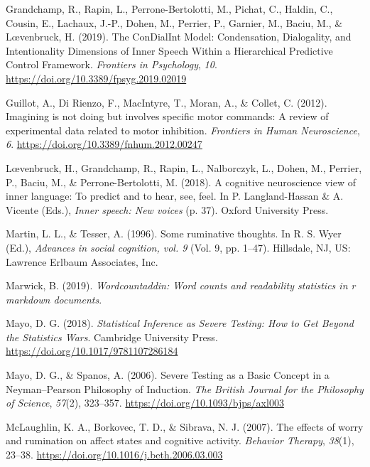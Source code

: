 \documentclass[
  english,
  man, donotrepeattitle,floatsintext]{apa6}
\newlength{\cslhangindent}
\newlength{\cslentryspacingunit} %
\newenvironment{CSLReferences}[2] %
 {%
  \setlength{\parindent}{0pt}
  \ifodd #1
  \let\oldpar\par
  \def\par{\hangindent=\cslhangindent\oldpar}
  \fi
  \setlength{\parskip}{#2\cslentryspacingunit}
 }%
 {}
\begin{document}
\begin{CSLReferences}{1}{0}
\leavevmode{}%
Grandchamp, R., Rapin, L., Perrone-Bertolotti, M., Pichat, C., Haldin, C., Cousin, E., Lachaux, J.-P., Dohen, M., Perrier, P., Garnier, M., Baciu, M., \& Lœvenbruck, H. (2019). The {ConDialInt Model}: Condensation, {Dialogality}, and {Intentionality Dimensions} of {Inner Speech Within} a {Hierarchical Predictive Control Framework}. \emph{Frontiers in Psychology}, \emph{10}. \url{https://doi.org/10.3389/fpsyg.2019.02019}

\leavevmode{}%
Guillot, A., Di Rienzo, F., MacIntyre, T., Moran, A., \& Collet, C. (2012). Imagining is not doing but involves specific motor commands: A review of experimental data related to motor inhibition. \emph{Frontiers in Human Neuroscience}, \emph{6}. \url{https://doi.org/10.3389/fnhum.2012.00247}

\leavevmode{}%
Lœvenbruck, H., Grandchamp, R., Rapin, L., Nalborczyk, L., Dohen, M., Perrier, P., Baciu, M., \& Perrone-Bertolotti, M. (2018). A cognitive neuroscience view of inner language: To predict and to hear, see, feel. In P. Langland-Hassan \& A. Vicente (Eds.), \emph{Inner speech: New voices} (p. 37). {Oxford University Press}.

\leavevmode{}%
Martin, L. L., \& Tesser, A. (1996). Some ruminative thoughts. In R. S. Wyer (Ed.), \emph{Advances in social cognition, vol. 9} (Vol. 9, pp. 1--47). {Hillsdale, NJ, US: Lawrence Erlbaum Associates, Inc}.

\leavevmode{}%
Marwick, B. (2019). \emph{Wordcountaddin: Word counts and readability statistics in r markdown documents}.

\leavevmode{}%
Mayo, D. G. (2018). \emph{Statistical {Inference} as {Severe Testing}: How to {Get Beyond} the {Statistics Wars}}. {Cambridge University Press}. \url{https://doi.org/10.1017/9781107286184}

\leavevmode{}%
Mayo, D. G., \& Spanos, A. (2006). Severe {Testing} as a {Basic Concept} in a {Neyman}--{Pearson Philosophy} of {Induction}. \emph{The British Journal for the Philosophy of Science}, \emph{57}(2), 323--357. \url{https://doi.org/10.1093/bjps/axl003}

\leavevmode{}%
McLaughlin, K. A., Borkovec, T. D., \& Sibrava, N. J. (2007). The effects of worry and rumination on affect states and cognitive activity. \emph{Behavior Therapy}, \emph{38}(1), 23--38. \url{https://doi.org/10.1016/j.beth.2006.03.003}


\end{CSLReferences}
\end{document}
